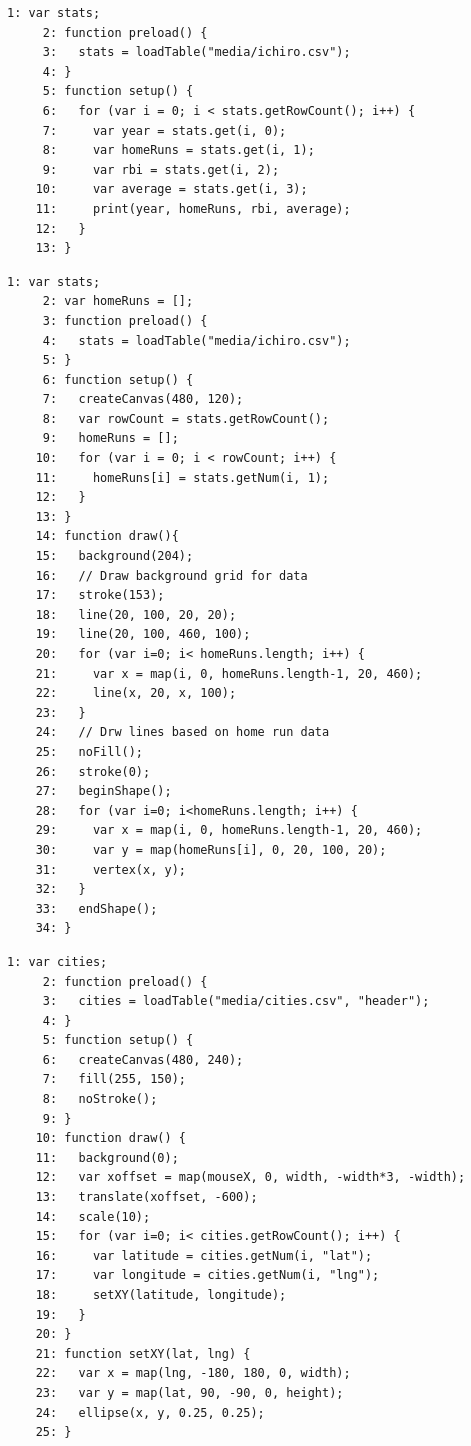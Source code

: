 \documentclass[a4j]{ltjsarticle}
\begin{document}
\vspace{1in}
\begin{lstlisting}[caption=Ex\_12\_01.js]
     1: var stats;
     2: function preload() {
     3:   stats = loadTable("media/ichiro.csv");
     4: }
     5: function setup() {
     6:   for (var i = 0; i < stats.getRowCount(); i++) {
     7:     var year = stats.get(i, 0);
     8:     var homeRuns = stats.get(i, 1);
     9:     var rbi = stats.get(i, 2);
    10:     var average = stats.get(i, 3);
    11:     print(year, homeRuns, rbi, average);
    12:   }
    13: }
\end{lstlisting}
\vspace{1in}
\begin{lstlisting}[caption=Ex\_12\_02.js]
     1: var stats;
     2: var homeRuns = [];
     3: function preload() {
     4:   stats = loadTable("media/ichiro.csv");
     5: }
     6: function setup() {
     7:   createCanvas(480, 120);
     8:   var rowCount = stats.getRowCount();
     9:   homeRuns = [];
    10:   for (var i = 0; i < rowCount; i++) {
    11:     homeRuns[i] = stats.getNum(i, 1);
    12:   }
    13: }
    14: function draw(){
    15:   background(204);
    16:   // Draw background grid for data
    17:   stroke(153);
    18:   line(20, 100, 20, 20);
    19:   line(20, 100, 460, 100);
    20:   for (var i=0; i< homeRuns.length; i++) {
    21:     var x = map(i, 0, homeRuns.length-1, 20, 460);
    22:     line(x, 20, x, 100);
    23:   }
    24:   // Drw lines based on home run data
    25:   noFill();
    26:   stroke(0);
    27:   beginShape();
    28:   for (var i=0; i<homeRuns.length; i++) {
    29:     var x = map(i, 0, homeRuns.length-1, 20, 460);
    30:     var y = map(homeRuns[i], 0, 20, 100, 20);
    31:     vertex(x, y);
    32:   }
    33:   endShape();
    34: }
\end{lstlisting}
\vspace{1in}
\begin{lstlisting}[caption=Ex\_12\_03.js]
     1: var cities;
     2: function preload() {
     3:   cities = loadTable("media/cities.csv", "header");
     4: }
     5: function setup() {
     6:   createCanvas(480, 240);
     7:   fill(255, 150);
     8:   noStroke();
     9: }
    10: function draw() {
    11:   background(0);
    12:   var xoffset = map(mouseX, 0, width, -width*3, -width);
    13:   translate(xoffset, -600);
    14:   scale(10);
    15:   for (var i=0; i< cities.getRowCount(); i++) {
    16:     var latitude = cities.getNum(i, "lat");
    17:     var longitude = cities.getNum(i, "lng");
    18:     setXY(latitude, longitude);
    19:   }
    20: }
    21: function setXY(lat, lng) {
    22:   var x = map(lng, -180, 180, 0, width);
    23:   var y = map(lat, 90, -90, 0, height);
    24:   ellipse(x, y, 0.25, 0.25);
    25: }
\end{lstlisting}
\end{document}

